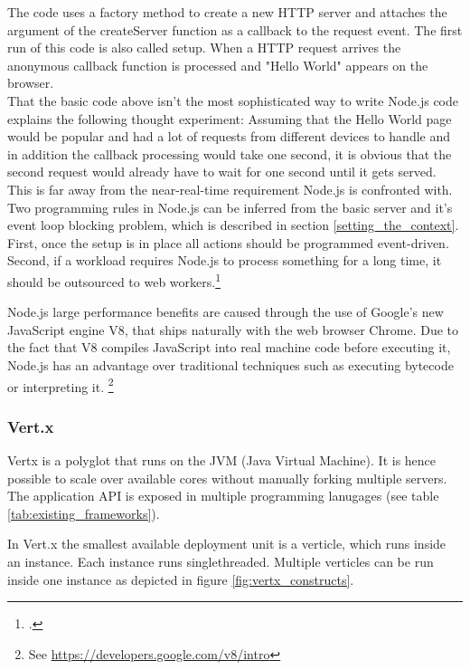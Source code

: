 The code uses a factory method to create a new HTTP server and attaches the
argument of the createServer function as a callback to the request event. The
first run of this code is also called setup. When a HTTP request arrives the
anonymous callback function is processed and "Hello World" appears on the
browser.\\
That the basic code above isn't the most sophisticated way to write Node.js code
explains the following thought experiment: Assuming that the Hello World page
would be popular and had a lot of requests from different devices to handle and
in addition the callback processing would take one second, it is obvious that the second
request would already have to wait for one second until it gets served. This is far away 
from the near-real-time requirement Node.js is confronted with.\\
Two programming rules in Node.js can be inferred from the basic server and it's
event loop blocking problem, which is described in section \ref{setting_the_context}.
First, once the setup is in place all actions should be programmed event-driven.
Second, if a workload requires Node.js to process something for a long time,
it should be outsourced to web workers.\footcite[Cf.][]{Croucher_2012}

Node.js large performance benefits are caused through the use of Google's new JavaScript engine V8, that ships naturally
with the web browser Chrome. Due to the fact that V8 compiles JavaScript into
real machine code before executing it, Node.js has an advantage over 
traditional techniques such as executing bytecode or interpreting it. \footnote{See \url{https://developers.google.com/v8/intro}}


\subsubsection{Vert.x}
\label{vert.x}

Vertx is a polyglot that runs on the JVM (Java Virtual Machine). It is hence
possible to scale over available cores without manually forking multiple
servers.\\
The application API is exposed in multiple programming lanugages (see table
\ref{tab:existing_frameworks}).

In Vert.x the smallest available deployment unit is a verticle, which runs
inside an instance. Each instance runs singlethreaded.
Multiple verticles can be run inside one instance as depicted in figure
\ref{fig:vertx_constructs}.

